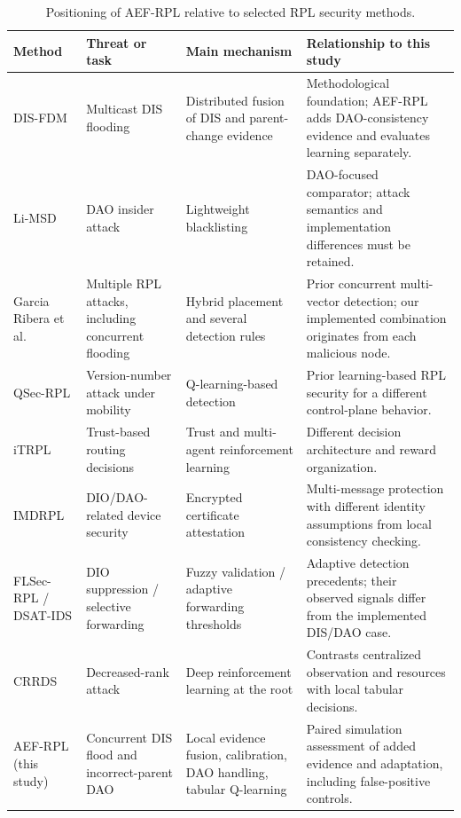 \begin{table}[t]
\caption{Positioning of AEF-RPL relative to selected RPL security methods.}
\label{tab:positioning}
\centering
\footnotesize
\setlength{\tabcolsep}{5pt}
\renewcommand{\arraystretch}{1.16}
\begin{tabularx}{\textwidth}{@{}p{}p{}p{}X@{}}
\toprule
Method & Threat or task & Main mechanism & Relationship to this study \\
\midrule
DIS-FDM \cite{prajisha2025} & Multicast DIS flooding & Distributed fusion of DIS and parent-change evidence & Methodological foundation; AEF-RPL adds DAO-consistency evidence and evaluates learning separately. \\
Li-MSD \cite{limsd2024} & DAO insider attack & Lightweight blacklisting & DAO-focused comparator; attack semantics and implementation differences must be retained. \\
Garcia Ribera et al.\ \cite{garciaribera2022} & Multiple RPL attacks, including concurrent flooding & Hybrid placement and several detection rules & Prior concurrent multi-vector detection; our implemented combination originates from each malicious node. \\
QSec-RPL \cite{qsecrpl2023} & Version-number attack under mobility & Q-learning-based detection & Prior learning-based RPL security for a different control-plane behavior. \\
iTRPL \cite{itrpl2024} & Trust-based routing decisions & Trust and multi-agent reinforcement learning & Different decision architecture and reward organization. \\
IMDRPL \cite{imdrpl2023} & DIO/DAO-related device security & Encrypted certificate attestation & Multi-message protection with different identity assumptions from local consistency checking. \\
FLSec-RPL / DSAT-IDS \cite{flsecrpl2024,dsatids2024} & DIO suppression / selective forwarding & Fuzzy validation / adaptive forwarding thresholds & Adaptive detection precedents; their observed signals differ from the implemented DIS/DAO case. \\
CRRDS \cite{haqdad2026} & Decreased-rank attack & Deep reinforcement learning at the root & Contrasts centralized observation and resources with local tabular decisions. \\
AEF-RPL (this study) & Concurrent DIS flood and incorrect-parent DAO & Local evidence fusion, calibration, DAO handling, tabular Q-learning & Paired simulation assessment of added evidence and adaptation, including false-positive controls. \\
\bottomrule
\end{tabularx}
\end{table}
